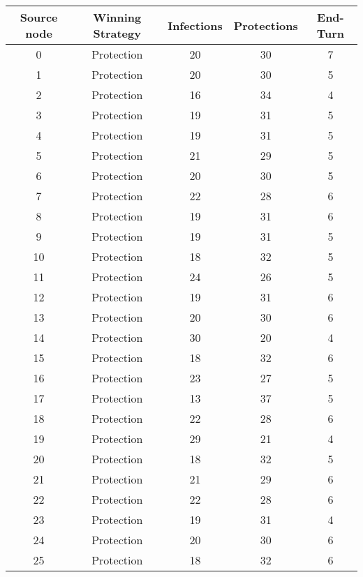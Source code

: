 \documentclass[results.tex]{subfiles}
\begin{document}
\begin{center}
  \begin{tabular}{| c || c | c | c | c |}
    \hline
    {\bfseries Source node} & {\bfseries Winning Strategy} & {\bfseries Infections} & {\bfseries Protections} & {\bfseries End-Turn} \\  %
    \hline\hline
    0 & Protection & 20 & 30 & 7 \\ 
    \hline
    1 & Protection & 20 & 30 & 5 \\ 
    \hline
    2 & Protection & 16 & 34 & 4 \\ 
    \hline
    3 & Protection & 19 & 31 & 5 \\ 
    \hline
    4 & Protection & 19 & 31 & 5 \\ 
    \hline
    5 & Protection & 21 & 29 & 5 \\ 
    \hline
    6 & Protection & 20 & 30 & 5 \\ 
    \hline
    7 & Protection & 22 & 28 & 6 \\ 
    \hline
    8 & Protection & 19 & 31 & 6 \\ 
    \hline
    9 & Protection & 19 & 31 & 5 \\ 
    \hline
    10 & Protection & 18 & 32 & 5 \\ 
    \hline
    11 & Protection & 24 & 26 & 5 \\ 
    \hline
    12 & Protection & 19 & 31 & 6 \\ 
    \hline
    13 & Protection & 20 & 30 & 6 \\ 
    \hline
    14 & Protection & 30 & 20 & 4 \\ 
    \hline
    15 & Protection & 18 & 32 & 6 \\ 
    \hline
    16 & Protection & 23 & 27 & 5 \\ 
    \hline
    17 & Protection & 13 & 37 & 5 \\ 
    \hline
    18 & Protection & 22 & 28 & 6 \\ 
    \hline
    19 & Protection & 29 & 21 & 4 \\ 
    \hline
    20 & Protection & 18 & 32 & 5 \\ 
    \hline
    21 & Protection & 21 & 29 & 6 \\ 
    \hline
    22 & Protection & 22 & 28 & 6 \\ 
    \hline
    23 & Protection & 19 & 31 & 4 \\ 
    \hline
    24 & Protection & 20 & 30 & 6 \\ 
    \hline
    25 & Protection & 18 & 32 & 6 \\ 

\end{tabular}
\end{center}
\end{document}
